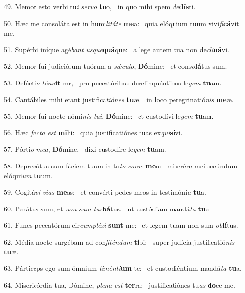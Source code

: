 49. Memor esto verbi tu\textit{i} \textit{ser}\textit{vo} \textbf{tu}o, \ast\  in quo mihi spem \textit{de}\textbf{dís}ti.\

50. Hæc me consoláta est in humi\textit{li}\textit{tá}\textit{te} \textbf{me}a: \ast\  quia elóquium tuum vivi\textit{fi}\textbf{cá}vit me.\

51. Supérbi iníque agé\textit{bant} \textit{us}\textit{que}\textbf{quá}que: \ast\  a lege autem tua non de\textit{cli}\textbf{ná}vi.\

52. Memor fui judiciórum tuórum a \textit{sǽ}\textit{cu}\textit{lo}, \textbf{Dó}mine: \ast\  et con\textit{so}\textbf{lá}tus sum.\

53. Defécti\textit{o} \textit{té}\textit{nu}\textbf{it} me, \ast\  pro peccatóribus derelinquéntibus le\textit{gem} \textbf{tu}am.\

54. Cantábiles mihi erant justifica\textit{ti}\textit{ó}\textit{nes} \textbf{tu}æ, \ast\  in loco peregrinatió\textit{nis} \textbf{me}æ.\

55. Memor fui nocte nómi\textit{nis} \textit{tu}\textit{i}, \textbf{Dó}mine: \ast\  et custodívi le\textit{gem} \textbf{tu}am.\

56. Hæc \textit{fac}\textit{ta} \textit{est} \textbf{mi}hi: \ast\  quia justificatiónes tuas ex\textit{qui}\textbf{sí}vi.\

57. Pórti\textit{o} \textit{me}\textit{a}, \textbf{Dó}mine, \ast\  dixi custodíre le\textit{gem} \textbf{tu}am.\

58. Deprecátus sum fáciem tuam in to\textit{to} \textit{cor}\textit{de} \textbf{me}o: \ast\  miserére mei secúndum elóqui\textit{um} \textbf{tu}um.\

59. Cogitá\textit{vi} \textit{vi}\textit{as} \textbf{me}as: \ast\  et convérti pedes meos in testimóni\textit{a} \textbf{tu}a.\

60. Parátus sum, et \textit{non} \textit{sum} \textit{tur}\textbf{bá}tus: \ast\  ut custódiam mandá\textit{ta} \textbf{tu}a.\

61. Funes peccatórum cir\textit{cum}\textit{plé}\textit{xi} \textbf{sunt} me: \ast\  et legem tuam non sum \textit{ob}\textbf{lí}tus.\

62. Média nocte surgébam ad con\textit{fi}\textit{tén}\textit{dum} \textbf{ti}bi: \ast\  super judícia justificatió\textit{nis} \textbf{tu}æ.\

63. Párticeps ego sum ómnium \textit{ti}\textit{mén}\textit{ti}\textbf{um} te: \ast\  et custodiéntium mandá\textit{ta} \textbf{tu}a.\

64. Misericórdia tua, Dómine, \textit{ple}\textit{na} \textit{est} \textbf{ter}ra: \ast\  justificatiónes tu\textit{as} \textbf{do}ce me.\

